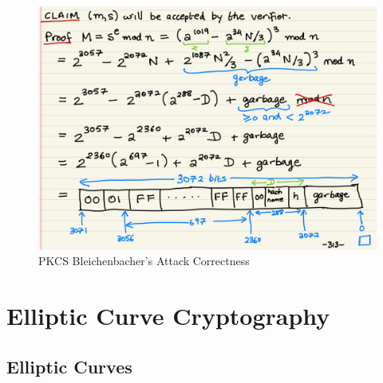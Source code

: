 \documentclass[12pt,titlepage]{article}
\let\stdsection\section
\renewcommand\section{\clearpage\stdsection}
\begin{document}
\begin{center}
	\begin{figure}[h!]
		\centering
		\includegraphics[width=\textwidth]{PKCS_Bleichenbacher's_Attack_Correctness.png}
		\caption{PKCS Bleichenbacher's Attack Correctness}
	\end{figure}
\end{center}

\section{Elliptic Curve Cryptography}
\subsection{Elliptic Curves}
\end{document}
